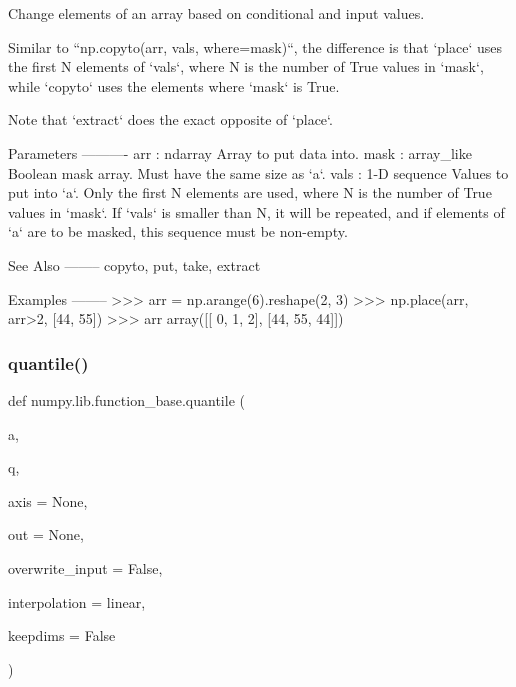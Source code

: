 \begin{DoxyVerb}Change elements of an array based on conditional and input values.

Similar to ``np.copyto(arr, vals, where=mask)``, the difference is that
`place` uses the first N elements of `vals`, where N is the number of
True values in `mask`, while `copyto` uses the elements where `mask`
is True.

Note that `extract` does the exact opposite of `place`.

Parameters
----------
arr : ndarray
    Array to put data into.
mask : array_like
    Boolean mask array. Must have the same size as `a`.
vals : 1-D sequence
    Values to put into `a`. Only the first N elements are used, where
    N is the number of True values in `mask`. If `vals` is smaller
    than N, it will be repeated, and if elements of `a` are to be masked,
    this sequence must be non-empty.

See Also
--------
copyto, put, take, extract

Examples
--------
>>> arr = np.arange(6).reshape(2, 3)
>>> np.place(arr, arr>2, [44, 55])
>>> arr
array([[ 0,  1,  2],
       [44, 55, 44]])\end{DoxyVerb}
 \mbox{\label{namespacenumpy_1_1lib_1_1function__base_a3e3baa0ec9b8a23019451193a4e3c401}} 
\subsubsection{\texorpdfstring{quantile()}{quantile()}}
{\footnotesize\ttfamily def numpy.\+lib.\+function\+\_\+base.\+quantile (\begin{DoxyParamCaption}\item[{}]{a,  }\item[{}]{q,  }\item[{}]{axis = {\ttfamily None},  }\item[{}]{out = {\ttfamily None},  }\item[{}]{overwrite\+\_\+input = {\ttfamily False},  }\item[{}]{interpolation = {\ttfamily \textquotesingle{}linear\textquotesingle{}},  }\item[{}]{keepdims = {\ttfamily False} }\end{DoxyParamCaption})}


